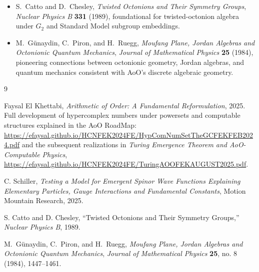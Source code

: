 \documentclass[12pt]{article}
\begin{document}
\begin{itemize}
    \item S.~Catto and D.~Chesley, 
    \emph{Twisted Octonions and Their Symmetry Groups}, \textit{Nuclear Physics B} \textbf{331} (1989), foundational for twisted-octonion algebra under $G_2$ and Standard Model subgroup embeddings.
    \item M.~Günaydin, C.~Piron, and H.~Ruegg,
    \emph{Moufang Plane, Jordan Algebras and Octonionic Quantum Mechanics}, 
    \textit{Journal of Mathematical Physics} \textbf{25} (1984), pioneering connections between octonionic geometry, Jordan algebras, and quantum mechanics consistent with AoO’s discrete algebraic geometry.
\end{itemize}

\begin{thebibliography}{9}

Faysal El Khettabi,
\textit{Arithmetic of Order: A Fundamental Reformulation}, 2025.
Full development of hypercomplex numbers under powersets and computable structures explained in the AoO RoadMap:
\url{https://efaysal.github.io/HCNFEK2024FE/HypComNumSetTheGCFEKFEB2024.pdf} and the subsequent realizations in \textit{Turing Emergence Theorem and AoO-Computable Physics},
\url{https://efaysal.github.io/HCNFEK2024FE/TuringAOOFEKAUGUST2025.pdf}.

C. Schiller,
\textit{Testing a Model for Emergent Spinor Wave Functions Explaining Elementary Particles, Gauge Interactions and Fundamental Constants},
Motion Mountain Research, 2025.

S. Catto and D. Chesley,
``Twisted Octonions and Their Symmetry Groups,''
\textit{Nuclear Physics B}, 1989.

M.~Günaydin, C.~Piron, and H.~Ruegg,
\emph{Moufang Plane, Jordan Algebras and Octonionic Quantum Mechanics},  
\textit{Journal of Mathematical Physics} \textbf{25}, no. 8 (1984), 1447–1461.

\end{thebibliography}
\end{document}
